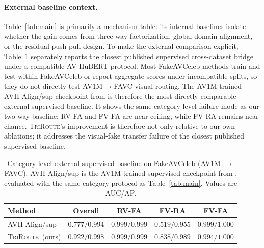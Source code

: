 \documentclass{article}
\newcommand{\method}{\textsc{TriRoute}}
\begin{document}
\paragraph{External baseline context.}
Table~\ref{tab:main} is primarily a mechanism table: its internal baselines isolate whether the gain comes from three-way factorization, global domain alignment, or the residual push-pull design. To make the external comparison explicit, Table~\ref{tab:external_category} separately reports the closest published supervised cross-dataset bridge under a compatible AV-HuBERT protocol. Most FakeAVCeleb methods train and test within FakeAVCeleb or report aggregate scores under incompatible splits, so they do not directly test AV1M$\rightarrow$FAVC visual routing. The AV1M-trained AVH-Align/sup checkpoint from \citet{smeu2025avhalign} is therefore the most directly comparable external supervised baseline. It shows the same category-level failure mode as our two-way baseline: RV-FA and FV-FA are near ceiling, while FV-RA remains near chance. \method's improvement is therefore not only relative to our own ablations; it addresses the visual-fake transfer failure of the closest published supervised baseline.

\begin{table}[t]
    \centering
    \caption{Category-level external supervised baseline on FakeAVCeleb (AV1M $\to$ FAVC). AVH-Align/sup is the AV1M-trained supervised checkpoint from \citet{smeu2025avhalign}, evaluated with the same category protocol as Table~\ref{tab:main}. Values are AUC/AP.}
    \label{tab:external_category}
    \small
    \begin{tabular}{lcccc}
        \toprule
        Method & Overall & RV-FA & FV-RA & FV-FA \\
        \midrule
        AVH-Align/sup \citep{smeu2025avhalign} & $0.777/0.994$ & $0.999/0.999$ & $0.519/0.955$ & $0.999/1.000$ \\
        \method\ (ours) & $\mathbf{0.922/0.998}$ & $0.999/0.999$ & $\mathbf{0.838/0.989}$ & $0.994/1.000$ \\
        \bottomrule
    \end{tabular}
\end{table}
\end{document}
